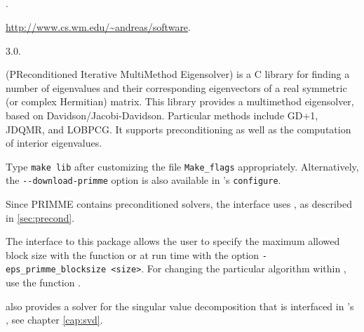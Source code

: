 \subsection*{\underline{\primme}}
	\begin{description}
	\setlength{\itemsep}{0pt}
	\item[References.]\citep{Stathopoulos:2010:PMS}.
	\item[Website.] \url{http://www.cs.wm.edu/~andreas/software}.
	\item[Version.] 3.0.
	\item[Summary.] \primme (PReconditioned Iterative MultiMethod Eigensolver) is a C library for finding a number of eigenvalues and their corresponding eigenvectors of a real symmetric (or complex Hermitian) matrix. This library provides a multimethod eigensolver, based on Davidson/Jacobi-Davidson. Particular methods include GD+1, JDQMR, and LOBPCG. It supports preconditioning as well as the computation of interior eigenvalues.
	\item[Installation.] Type \texttt{make lib} after customizing the file \texttt{Make\_flags} appropriately. Alternatively, the \texttt{-{}-download-primme} option is also available in \slepc's \texttt{configure}.
	\item[Specific options.] Since PRIMME contains preconditioned solvers, the \slepc interface uses , as described in \ref{sec:precond}.

The \slepc interface to this package allows the user to specify the maximum allowed block size with the function  or at run time with the option \Verb!-eps_primme_blocksize <size>!.
For changing the particular algorithm within \primme, use the function .

\primme also provides a solver for the singular value decomposition that is interfaced in \slepc's , see chapter \ref{cap:svd}.
	\end{description}

